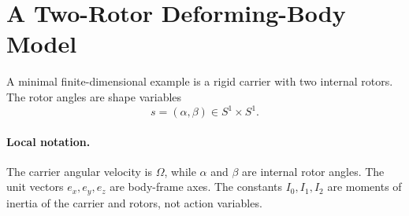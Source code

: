 \section{A Two-Rotor Deforming-Body Model}
\label{sec:two-rotor-deforming-body-model}

A minimal finite-dimensional example is a rigid carrier with two internal
rotors. The rotor angles are shape variables
\[
  s=(\alpha,\beta)\in S^1\times S^1.
\]

\paragraph{Local notation.}
The carrier angular velocity is \(\Omega\), while \(\alpha\) and \(\beta\) are
internal rotor angles.  The unit vectors \(e_x,e_y,e_z\) are body-frame axes.
The constants \(I_0,I_1,I_2\) are moments of inertia of the carrier and
rotors, not action variables.

